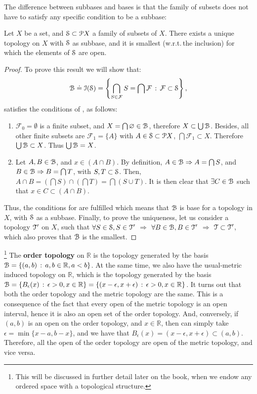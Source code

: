 The difference between subbases and bases is that the family of subsets does not have
to satisfy any specific condition to be a subbase:

\begin{theorem}
	Let $X$ be a set, and $\S\subset \P X$ a family of subsets of $X$.
	There exists a unique topology on $X$ with $\S$ as subbase, and it is smallest
	(w.r.t.\,the inclusion) for which the elements of $\S$ are open.
	\label{th:1-4}
\end{theorem}

\begin{proof}
	To prove this result we will show that:
	\[
	\B\doteq \I(\S)=\left\{\bigcap\limits_{S\in\mathcal{F}} S=\bigcap\mathcal{F}\,:\,\mathcal{F}\subset \S\right\},
	\]
	satisfies the conditions of , as follows:
	\begin{enumerate}
		\item $\mathcal{F}_{0}=\emptyset$ is a finite subset, and $X=\bigcap \emptyset\in\B$, therefore $X\subset
		\bigcup\B$.
		Besides, all other finite subsets are $\mathcal{F}_{1}=\{A\}$ with $A\in\S
		\subset\P X$, $\bigcap\mathcal{F}_{1}\subset X$.
		Therefore $\bigcup \B\subset X$.
		Thus $\bigcup\B = X$.
		\item Let $A, B\in \B$, and $x\in (A\cap B)$.
		By definition, $A\in\B \Rightarrow A=\bigcap S$,
		and $B\in \B \Rightarrow B =\bigcap T$, with $S, T\subset \S$.
		Then, $A\cap B = \left(\bigcap S\right)\cap\left(\bigcap T\right)=\bigcap (S\cup T)$.
		It is then clear that $\exists C\in\B$ such that $x\in C\subset (A\cap B)$.
	\end{enumerate}
	Thus, the conditions for  are fulfilled which means that
	$\B$ is base for a topology in $X$, with $\S$ as a subbase.
	Finally, to prove the uniqueness, let us consider a topology $\T'$ on $X$, 
	such that $\forall S\in \S, S\in \T'$ $\Rightarrow$ $\forall B\in\B, B\in\T'$ 
	$\Rightarrow$ $\T\subset \T'$, which also proves that $\B$ is the smallest.
\end{proof}

\begin{example}
	\footnote{This will be discussed in further detail later on the book, when
	we endow any ordered space with a topological structure.}
	The \textbf{order topology} on $\mathbb{R}$ is the topology generated by the
	basis $\B=\setdef{(a,b)}{a,b\in\mathbb{R}, a<b}$. At the same time, we also have
	the usual-metric induced topology on $\mathbb{R}$, which is the topology
	generated by the basis $\B=\setdef{B_\epsilon(x)}{\epsilon>0, x\in\mathbb{R}} = \setdef{(x-\epsilon, x+\epsilon)}{\epsilon>0, x\in\mathbb{R}}$.
	It turns out that both the order topology and the metric topology are the same.
	This is a consequence of the fact that every open of the metric topology is an
	open interval, hence it is also an open set of the order topology. And, conversely,
	if $(a,b)$ is an open on the order topology, and $x\in\mathbb{R}$, then can simply
	take $\epsilon=\min\{x-a, b-x\}$, and we have that $B_\epsilon(x)=(x-\epsilon, x+\epsilon)\subset (a,b)$.
	Therefore, all the open of the order topology are open of the metric topology, and
	vice versa.
\end{example}

